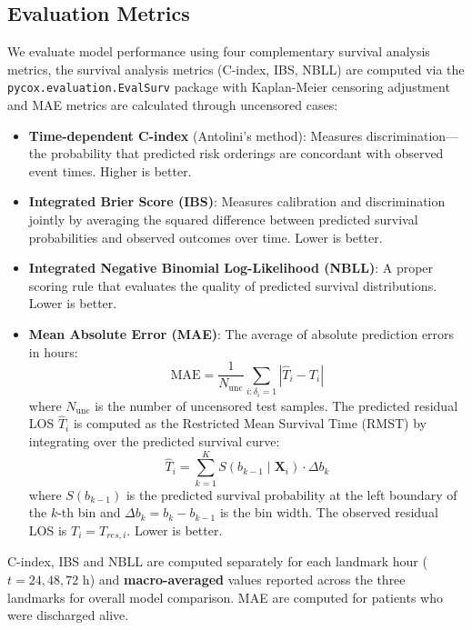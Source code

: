 \documentclass[10pt, a4paper]{article}
\begin{document}
\subsection{Evaluation Metrics}

We evaluate model performance using four complementary survival analysis metrics, the survival analysis metrics (C-index, IBS, NBLL) are computed via the \texttt{pycox.evaluation.EvalSurv} package with Kaplan-Meier censoring adjustment and MAE metrics are calculated through uncensored cases:

\begin{itemize}[nosep]
    \item \textbf{Time-dependent C-index} (Antolini's method): Measures discrimination---the probability that predicted risk orderings are concordant with observed event times. Higher is better.
    \item \textbf{Integrated Brier Score (IBS)}: Measures calibration and discrimination jointly by averaging the squared difference between predicted survival probabilities and observed outcomes over time. Lower is better.
    \item \textbf{Integrated Negative Binomial Log-Likelihood (NBLL)}: A proper scoring rule that evaluates the quality of predicted survival distributions. Lower is better.
    \item \textbf{Mean Absolute Error (MAE)}: The average of absolute prediction errors in hours:
  \begin{equation}
      \text{MAE} = \frac{1}{N_{\text{unc}}}
      \sum_{i : \delta_i = 1} \left| \hat{T}_i - T_i \right|
      \label{eq:mae}
  \end{equation}
  where $N_{\text{unc}}$ is the number of uncensored test samples. The predicted residual LOS $\hat{T}_i$ is computed as the Restricted Mean Survival Time (RMST) by integrating over the predicted survival curve: 
  \begin{equation}\hat{T}_i = \sum_{k=1}^{K} S(b_{k-1} \mid \mathbf{X}_i) \cdot \Delta b_k
  \end{equation} 
  where $S(b_{k-1})$ is the predicted survival probability at the left boundary of the $k$-th bin and $\Delta b_k = b_k - b_{k-1}$ is the bin width. The observed residual LOS is $T_i = T_{res,i}$. Lower is better.
\end{itemize}
C-index, IBS and NBLL are computed separately for each landmark hour ($t = 24, 48, 72$ h) and \textbf{macro-averaged} values reported across the three landmarks for overall model comparison. MAE are computed for patients who were discharged alive.
\end{document}
